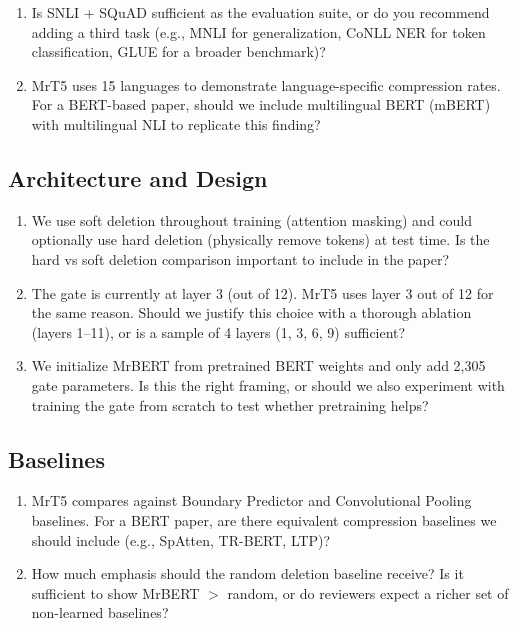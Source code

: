 \documentclass[11pt,a4paper]{article}
\begin{document}
\begin{enumerate}
    \item Is SNLI + SQuAD sufficient as the evaluation suite, or do you recommend adding a third task (e.g., MNLI for generalization, CoNLL NER for token classification, GLUE for a broader benchmark)?
    \item MrT5 uses 15 languages to demonstrate language-specific compression rates. For a BERT-based paper, should we include multilingual BERT (mBERT) with multilingual NLI to replicate this finding?
\end{enumerate}

\subsection{Architecture and Design}

\begin{enumerate}[resume]
    \item We use soft deletion throughout training (attention masking) and could optionally use hard deletion (physically remove tokens) at test time. Is the hard vs soft deletion comparison important to include in the paper?
    \item The gate is currently at layer 3 (out of 12). MrT5 uses layer 3 out of 12 for the same reason. Should we justify this choice with a thorough ablation (layers 1--11), or is a sample of 4 layers (1, 3, 6, 9) sufficient?
    \item We initialize MrBERT from pretrained BERT weights and only add 2,305 gate parameters. Is this the right framing, or should we also experiment with training the gate from scratch to test whether pretraining helps?
\end{enumerate}

\subsection{Baselines}

\begin{enumerate}[resume]
    \item MrT5 compares against Boundary Predictor and Convolutional Pooling baselines. For a BERT paper, are there equivalent compression baselines we should include (e.g., SpAtten, TR-BERT, LTP)?
    \item How much emphasis should the random deletion baseline receive? Is it sufficient to show MrBERT $>$ random, or do reviewers expect a richer set of non-learned baselines?
\end{enumerate}
\end{document}
